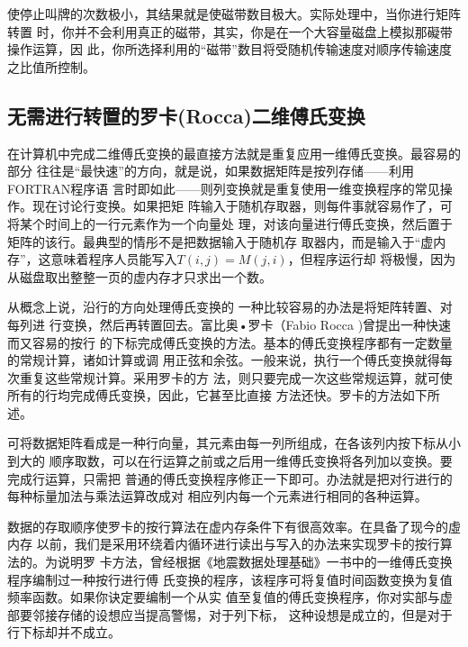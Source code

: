 使停止叫牌的次数极小，其结果就是使磁带数目极大。实际处理中，当你进行矩阵转置
时，你并不会利用真正的磁带，其实，你是在一个大容量磁盘上模拟那礙带操作运算，因
此，你所选择利用的“磁带”数目将受随机传输速度对顺序传输速度之比值所控制。

\subsection{无需进行转置的罗卡(Rocca)二维傅氏变换}
\label{sec:1.6.3}

在计算机中完成二维傅氏变换的最直接方法就是重复应用一维傅氏变换。最容易的部分
往往是“最快速”的方向，就是说，如果数据矩阵是按列存储——利用FORTRAN程序语
言时即如此——则列变换就是重复使用一维变换程序的常见操作。现在讨论行变换。如果把矩
阵输入于随机存取器，则每件事就容易作了，可将某个时间上的一行元素作为一个向量处
理，对该向量进行傅氏变换，然后置于矩阵的该行。最典型的情彤不是把数据输入于随机存
取器内，而是输入于“虚内存”，这意味着程序人员能写入$T(i,j)=M(j,i)$，但程序运行却
将极慢，因为从磁盘取出整整一页的虚内存才只求出一个数。

从概念上说，沿行的方向处理傅氏变换的
一种比较容易的办法是将矩阵转置、对每列进
行变换，然后再转置回去。富比奥•罗卡（Fabio Rocca
)曾提出一种快速而又容易的按行
的下标完成傅氏变换的方法。基本的傅氏变换程序都有一定数量的常规计算，诸如计算或调
用正弦和余弦。一般来说，执行一个傅氏变换就得每次重复这些常规计算。采用罗卡的方
法，则只要完成一次这些常规运算，就可使所有的行均完成傅氏变换，因此，它甚至比直接
方法还快。罗卡的方法如下所述。

可将数据矩阵看成是一种行向量，其元素由每一列所组成，在各该列内按下标从小到大的
顺序取数，可以在行运算之前或之后用一维傅氏变换将各列加以变换。要完成行运算，只需把
普通的傅氏变换程序修正一下即可。办法就是把对行进行的每种标量加法与乘法运算改成对
相应列内每一个元素进行相同的各种运算。

数据的存取顺序使罗卡的按行算法在虚内存条件下有很高效率。在具备了现今的虛内存
以前，我们是采用环绕着内循环进行读出与写入的办法来实现罗卡的按行算法的。为说明罗
卡方法，曾经根据《地震数据处理基础》一书中的一维傅氏变换程序编制过一种按行进行傅
氏变换的程序，该程序可将复值时间函数变换为复值频率函数。如果你诀定要编制一个从实
值至复值的傅氏变换程序，你对实部与虚部要邻接存储的设想应当提高警惕，对于列下标，
这种设想是成立的，但是对于行下标却并不成立。
